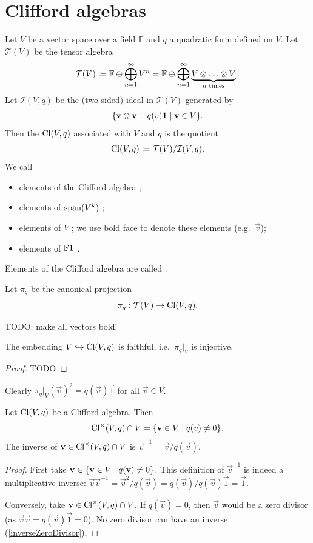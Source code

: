\section{Clifford algebras}
\begin{definition}
Let $V$ be a vector space over a field $\mathbb{F}$ and $q$ a quadratic form defined on $V$.
Let $\mathcal{T}(V)$ be the tensor algebra
\[ \mathcal{T}(V) \coloneqq \mathbb{F}\oplus \bigoplus_{n=1}^\infty V^n = \mathbb{F}\oplus \bigoplus_{n=1}^\infty \underbrace{V\otimes \ldots \otimes V}_{\text{$n$ times}}. \]
Let $\mathcal{I}(V,q)$ be the (two-sided) ideal in $\mathcal{T}(V)$ generated by
\[ \setbuilder{\vec{v}\otimes \vec{v} - q(v) \vec{1}}{\vec{v}\in V}. \]
Then the  $\operatorname{Cl}(V,q)$ associated with $V$ and $q$ is the quotient
\[ \operatorname{Cl}(V,q) \coloneqq \mathcal{T}(V)/\mathcal{I}(V,q). \]
We call
\begin{itemize}
    \item elements of the Clifford algebra ;
    \item elements of $\operatorname{span}(V^k)$ ;
    \item elements of $V$ ; we use bold face to denote these elements (e.g.\ $\vec{v}$);
    \item elements of $\mathbb{F}\boldsymbol{\mathrm{1}}$ .
\end{itemize}
Elements of the Clifford algebra are called .
\end{definition}
Let $\pi_q$ be the canonical projection
\[ \pi_q: \mathcal{T}(V) \to \operatorname{Cl}(V,q). \]


TODO: make all vectors bold!

\begin{lemma}
The embedding $V\hookrightarrow \operatorname{Cl}(V,q)$ is faithful, i.e.\ $\pi_q|_V$ is injective.
\end{lemma}
\begin{proof}
TODO
\end{proof}
Clearly $\pi_q|_V(\vec{v})^2 = q(\vec{v}) \vec{1}$ for all $\vec{v}\in V$.

\begin{lemma} \label{vectorInverseCliffordAlgebra}
Let $\operatorname{Cl}(V,q)$ be a Clifford algebra. Then
\[ \Cl^\times(V,q) \cap V = \setbuilder{\vec{v}\in V}{q(v) \neq 0}. \]
The inverse of $\boldsymbol{\mathrm{v}}\in \operatorname{Cl}^\times(V,q) \cap V$ is $\vec{v}^{-1} = \vec{v}/q(\vec{v})$.
\end{lemma}
\begin{proof}
First take $\vec{v}\in \setbuilder{\vec{v}\in V}{q(\vec{v}) \neq 0}$. This definition of $\vec{v}^{-1}$ is indeed a multiplicative inverse: $\vec{v}\vec{v}^{-1} = \vec{v}^2/q(\vec{v}) = q(\vec{v})/q(\vec{v})\vec{1} = \vec{1}$.

Conversely, take $\boldsymbol{\mathrm{v}}\in \operatorname{Cl}^\times(V,q) \cap V$. If $q(\vec{v}) = 0$, then $\vec{v}$ would be a zero divisor (as $\vec{v}\vec{v} = q(\vec{v})\vec{1} = 0$). No zero divisor can have an inverse (\ref{inverseZeroDivisor}), 
\end{proof}

